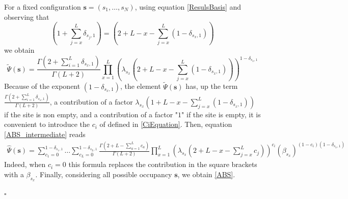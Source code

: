 \documentclass[11pt]{article}
\numberwithin{equation}{section}
\numberwithin{equation}{subsection}
\begin{document}
For a fixed configuration $\bm{s}=(s_{1},\ldots,s_{N})$, using equation \eqref{ResulsBasis} and observing that 
\begin{equation}
  \left(1+\sum_{j=x}^{L}\delta_{s_{j},1}\right) =\left(2+L-x-\sum_{j=x}^{L}(1-\delta_{s_{x},1})\right)
\end{equation}
we obtain 
    \begin{equation}
	\widetilde{\Psi}(\bm{s})=\frac{\Gamma(2+\sum_{i=1}^{L}\delta_{s_{x},1})}{\Gamma(L+2)}\prod_{x=1}^{L}\left(\lambda_{s_{x}}\left(2+L-x-\sum_{j=x}^{L}(1-\delta_{s_{x},1})\right)\right)^{1-\delta_{s_{x},1}}
\end{equation}
Because of the exponent $(1-\delta_{s_{x},1})$, the element $\widetilde{\Psi}(\bm{s})$ has, up the term $\frac{\Gamma(2+\sum_{i=1}^{L}\delta_{s_{x},1})}{\Gamma(L+2)}$, a contribution of a factor $\lambda_{s_{x}}\left(1+L-x-\sum_{j=x}^{L}(1-\delta_{s_{x},1})\right)$ if the site is non empty, and a contribution of a factor "$1$" if the site is empty, it is convenient to introduce the $c_{i}$ of defined in \eqref{CiEquation}. Then, equation  \eqref{ABS_intermediate} reads 
\begin{equation}\label{elementsABS}
	\begin{split}
		\widehat{\Psi}(\mathbf{s})=\sum_{c_{1}=0}^{1-\delta_{s_{1},1}}\ldots\sum_{c_{L}=0}^{1-\delta_{s_{L},1}}\frac{\Gamma(2+L-\sum_{a=1}^{L}c_{a})}{\Gamma(L+2)}\prod_{x=1}^{L}\left(\lambda_{s_{x}}\left(2+L-x-\sum_{j=x}^{L}c_{j}\right)\right)^{c_{i}}\left(\beta_{s_{x}}\right)^{(1-c_{i})(1-\delta_{s_{x},1})}
	\end{split}
\end{equation} 
Indeed, when $c_{i}=0$ this formula replaces the contribution in the square brackets with a $\beta_{s_{x}}$. 
Finally, considering all possible occupancy $\bm{s}$, we obtain \eqref{ABS}.
\begin{flushright}
    $\square$
\end{flushright}
\end{document}

